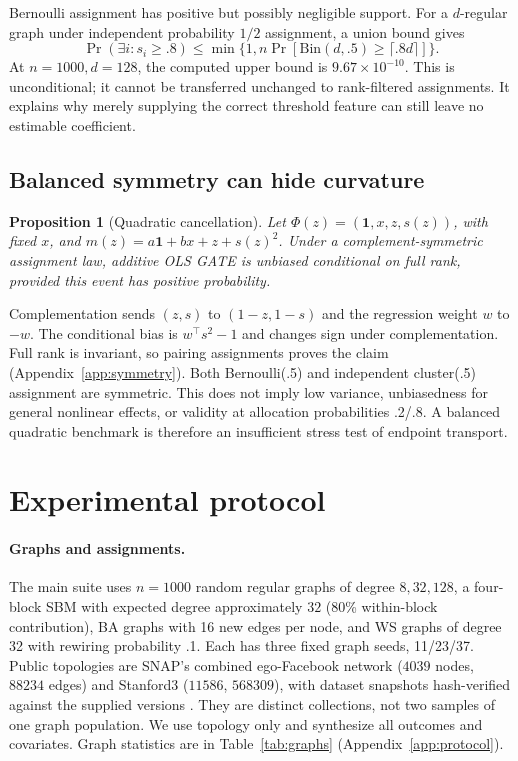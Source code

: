 \documentclass{article}
\newtheorem{proposition}{Proposition}
\newcommand{\one}{\mathbf 1}
\begin{document}
Bernoulli assignment has positive but possibly negligible support. For a $d$-regular graph under independent probability $1/2$ assignment, a union bound gives
\begin{equation}\label{eq:visibility}
\Pr(\exists i:s_i\geq .8)\leq \min\{1,n\Pr[\mathrm{Bin}(d,.5)\geq\lceil .8d\rceil]\}.
\end{equation}
At $n=1000,d=128$, the computed upper bound is $9.67\times10^{-10}$. This is unconditional; it cannot be transferred unchanged to rank-filtered assignments. It explains why merely supplying the correct threshold feature can still leave no estimable coefficient.

\subsection{Balanced symmetry can hide curvature}\label{sec:symmetry}
\begin{proposition}[Quadratic cancellation]\label{prop:symmetry}
Let $\Phi(z)=(\one,x,z,s(z))$, with fixed $x$, and $m(z)=a\one+bx+z+s(z)^2$. Under a complement-symmetric assignment law, additive OLS GATE is unbiased conditional on full rank, provided this event has positive probability.
\end{proposition}
Complementation sends $(z,s)$ to $(1-z,1-s)$ and the regression weight $w$ to $-w$. The conditional bias is $w^\top s^2-1$ and changes sign under complementation. Full rank is invariant, so pairing assignments proves the claim (Appendix~\ref{app:symmetry}). Both Bernoulli(.5) and independent cluster(.5) assignment are symmetric. This does not imply low variance, unbiasedness for general nonlinear effects, or validity at allocation probabilities .2/.8. A balanced quadratic benchmark is therefore an insufficient stress test of endpoint transport.

\section{Experimental protocol}\label{sec:experiments}
\paragraph{Graphs and assignments.}
The main suite uses $n=1000$ random regular graphs of degree $8,32,128$, a four-block SBM with expected degree approximately $32$ (80\% within-block contribution), BA graphs with 16 new edges per node, and WS graphs of degree 32 with rewiring probability .1. Each has three fixed graph seeds, 11/23/37. Public topologies are SNAP's combined ego-Facebook network ($4039$ nodes, $88234$ edges) and Stanford3 ($11586$, $568309$), with dataset snapshots hash-verified against the supplied versions \citep{snap,nr,traud}. They are distinct collections, not two samples of one graph population. We use topology only and synthesize all outcomes and covariates. Graph statistics are in Table~\ref{tab:graphs} (Appendix~\ref{app:protocol}).
\end{document}
